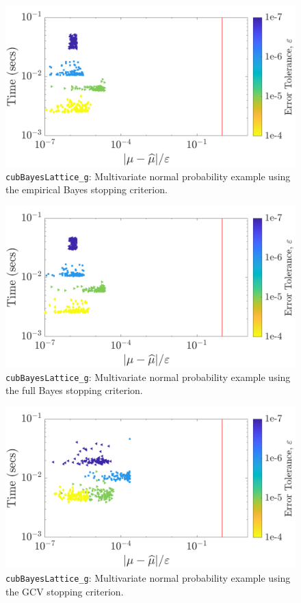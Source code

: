 \documentclass{iitthesis}          %
\newcommand{\code}[1]{\texttt{#1}}
\begin{document}
\begin{figure}
	\centering
	\includegraphics[width=0.95\linewidth]{"Lattice/Lattice_MVN_guaranteed_time_MLE_C2sin_d2_r2_2019-Jun-16"}
	\caption[Lattice: MVN Guaranteed: MLE]{\code{cubBayesLattice\_g}: Multivariate normal probability example using the empirical Bayes stopping criterion.}
	\label{fig:mvn-guaranteed-MLE}
\end{figure}
\begin{figure}
	\centering
	\includegraphics[width=0.95\linewidth]{"Lattice/Lattice_MVN_guaranteed_time_full_C2sin_d2_r2_2019-Jun-16"}
	\caption[Lattice: MVN guaranteed: Full Bayes]{\code{cubBayesLattice\_g}: Multivariate normal probability example using the full Bayes stopping criterion.}
	\label{fig:mvn-guaranteed-FB}
\end{figure}
\begin{figure}
	\centering
	\includegraphics[width=0.95\linewidth]{"Lattice/Lattice_MVN_guaranteed_time_GCV_C2sin_d2_r2_2019-Jun-15"}
	\caption[Lattice: MVN guaranteed: GCV]{\code{cubBayesLattice\_g}: Multivariate normal probability example using the GCV stopping criterion.}
	\label{fig:mvn-guaranteed-GCV}
\end{figure}
\end{document}
